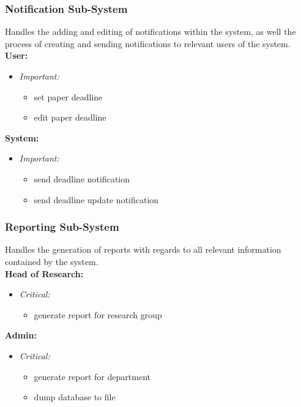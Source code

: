\documentclass{article}
\begin{document}
			\subsubsection{Notification Sub-System}\label{subsubsec:priority-notification}
				Handles the adding and editing of notifications within the system, as well the process of creating and sending notifications to relevant users of the system.\\
				[3mm]
				\textbf{User:}
				\begin{itemize}					
					\item \textit{Important:}
					\begin{itemize}
						\item set paper deadline
						\item edit paper deadline
					\end{itemize}
				\end{itemize}
				\textbf{System:}
				\begin{itemize}
					\item \textit{Important:}
					\begin{itemize}
						\item send deadline notification
						\item send deadline update notification
					\end{itemize}
				\end{itemize}
			\subsubsection{Reporting Sub-System}\label{subsubsec:priority-report}
				Handles the generation of reports with regards to all relevant information contained by the system.\\
				[3mm]
				\textbf{Head of Research:}
				\begin{itemize}					
					\item \textit{Critical:}
					\begin{itemize}
						\item generate report for research group
					\end{itemize}
				\end{itemize}
				\textbf{Admin:}
				\begin{itemize}
					\item \textit{Critical:}
					\begin{itemize}
						\item generate report for department
						\item dump database to file
					\end{itemize}
				\end{itemize}
\end{document}
